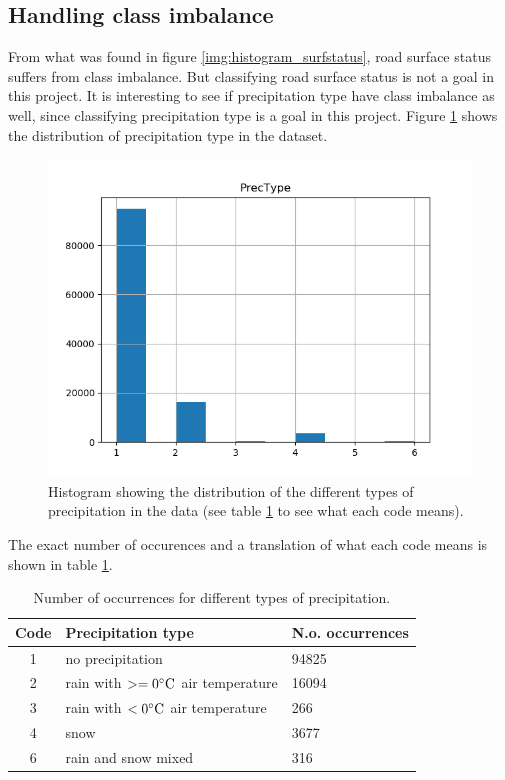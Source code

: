\subsection{Handling class imbalance} \label{sec:class_imbalance}
	From what was found in figure \ref{img:histogram_surfstatus}, road surface status suffers from class imbalance. But classifying road surface status is not a goal in this project. It is interesting to see if precipitation type have class imbalance as well, since classifying precipitation type is a goal in this project. Figure \ref{img:correlations_featureengi} shows the distribution of precipitation type in the dataset. 
	
	\begin{figure}[H] 
	\centering
	\includegraphics[width=1\textwidth]{media/histogram_prectype.png}
	\caption{Histogram showing the distribution of the different types of precipitation in the data (see table \ref{table:occurences_prectype} to see what each code means).}
	\label{img:correlations_featureengi}
	\end{figure}

	The exact number of occurences and a translation of what each code means is shown in table \ref{table:occurences_prectype}.

	\begin{table}[H]
	\centering
	\caption{Number of occurrences for different types of precipitation. }
		\begin{tabular}[3]{c | l | l}
    			Code & Precipitation type & N.o. occurrences \\
    			\hline
			1 & no precipitation & 94825 \\
			2 & rain with $>= 0 \celsius$ air temperature & 16094 \\
			3 & rain with $< 0 \celsius$ air temperature & 266 \\
			4 & snow & 3677 \\
			6 & rain and snow mixed & 316 
			\label{table:occurences_prectype}
		\end{tabular}
	\end{table}

